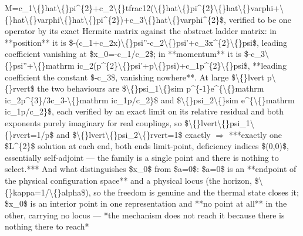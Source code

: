 \begin{description}
M=c\_1\textbackslash\{\}hat\textbackslash\{\}pi\textasciicircum{}\{2\}+c\_2\textbackslash\{\}tfrac12(\textbackslash\{\}hat\textbackslash\{\}pi\textasciicircum{}\{2\}\textbackslash\{\}hat\textbackslash\{\}varphi+\textbackslash\{\}hat\textbackslash\{\}varphi\textbackslash\{\}hat\textbackslash\{\}pi\textasciicircum{}\{2\})+c\_3\textbackslash\{\}hat\textbackslash\{\}varphi\textasciicircum{}\{2\}\$, verified to be one operator by its exact Hermite matrix against the abstract ladder matrix: in **position** it is \$-(c\_1+c\_2x)\textbackslash\{\}psi''-c\_2\textbackslash\{\}psi'+c\_3x\textasciicircum{}\{2\}\textbackslash\{\}psi\$, leading coefficient vanishing at \$x\_0=-c\_1/c\_2\$; in **momentum** it is \$-c\_3\textbackslash\{\}psi''+\textbackslash\{\}mathrm ic\_2(p\textasciicircum{}\{2\}\textbackslash\{\}psi'+p\textbackslash\{\}psi)+c\_1p\textasciicircum{}\{2\}\textbackslash\{\}psi\$, **leading coefficient the constant \$-c\_3\$, vanishing nowhere**. At large \$\textbackslash\{\}lvert p\textbackslash\{\}rvert\$ the two behaviours are \$\textbackslash\{\}psi\_1\textbackslash\{\}sim p\textasciicircum{}\{-1\}e\textasciicircum{}\{\textbackslash\{\}mathrm ic\_2p\textasciicircum{}\{3\}/3c\_3-\textbackslash\{\}mathrm ic\_1p/c\_2\}\$ and \$\textbackslash\{\}psi\_2\textbackslash\{\}sim e\textasciicircum{}\{\textbackslash\{\}mathrm ic\_1p/c\_2\}\$, each verified by an exact limit on its relative residual and both exponents purely imaginary for real couplings, so \$\textbackslash\{\}lvert\textbackslash\{\}psi\_1\textbackslash\{\}rvert=1/p\$ and \$\textbackslash\{\}lvert\textbackslash\{\}psi\_2\textbackslash\{\}rvert=1\$ exactly \ensuremath{\Rightarrow} ***exactly one \$L\textasciicircum{}\{2\}\$ solution at each end, both ends limit-point, deficiency indices \$(0,0)\$, essentially self-adjoint --- the family is a single point and there is nothing to select.*** And what distinguishes \$x\_0\$ from \$a=0\$: \$a=0\$ is an **endpoint of the physical configuration space** and a physical locus (the horizon, \$\textbackslash\{\}kappa=1/\textbackslash\{\}alpha\$), so the freedom is genuine and the thermal state closes it; \$x\_0\$ is an interior point in one representation and **no point at all** in the other, carrying no locus --- *the mechanism does not reach it because there is nothing there to reach*

\end{description}

